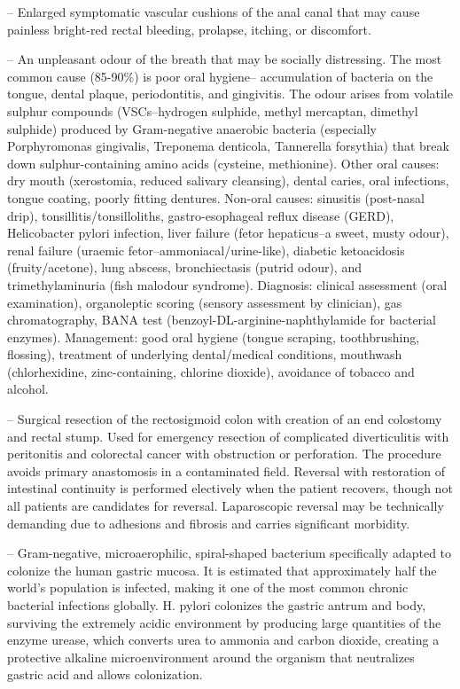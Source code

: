 -- Enlarged symptomatic vascular cushions of the anal canal that may cause painless bright-red rectal bleeding, prolapse, itching, or discomfort.

-- An unpleasant odour of the breath that may be socially distressing. The most common cause (85-90\%) is poor oral hygiene-- accumulation of bacteria on the tongue, dental plaque, periodontitis, and gingivitis. The odour arises from volatile sulphur compounds (VSCs--hydrogen sulphide, methyl mercaptan, dimethyl sulphide) produced by Gram-negative anaerobic bacteria (especially Porphyromonas gingivalis, Treponema denticola, Tannerella forsythia) that break down sulphur-containing amino acids (cysteine, methionine). Other oral causes: dry mouth (xerostomia, reduced salivary cleansing), dental caries, oral infections, tongue coating, poorly fitting dentures. Non-oral causes: sinusitis (post-nasal drip), tonsillitis/tonsilloliths, gastro-esophageal reflux disease (GERD), Helicobacter pylori infection, liver failure (fetor hepaticus--a sweet, musty odour), renal failure (uraemic fetor--ammoniacal/urine-like), diabetic ketoacidosis (fruity/acetone), lung abscess, bronchiectasis (putrid odour), and trimethylaminuria (fish malodour syndrome). Diagnosis: clinical assessment (oral examination), organoleptic scoring (sensory assessment by clinician), gas chromatography, BANA test (benzoyl-DL-arginine-naphthylamide for bacterial enzymes). Management: good oral hygiene (tongue scraping, toothbrushing, flossing), treatment of underlying dental/medical conditions, mouthwash (chlorhexidine, zinc-containing, chlorine dioxide), avoidance of tobacco and alcohol.

-- Surgical resection of the rectosigmoid colon with creation of an end colostomy and rectal stump. Used for emergency resection of complicated diverticulitis with peritonitis and colorectal cancer with obstruction or perforation. The procedure avoids primary anastomosis in a contaminated field. Reversal with restoration of intestinal continuity is performed electively when the patient recovers, though not all patients are candidates for reversal. Laparoscopic reversal may be technically demanding due to adhesions and fibrosis and carries significant morbidity.

-- Gram-negative, microaerophilic, spiral-shaped bacterium specifically adapted to colonize the human gastric mucosa. It is estimated that approximately half the world's population is infected, making it one of the most common chronic bacterial infections globally. H. pylori colonizes the gastric antrum and body, surviving the extremely acidic environment by producing large quantities of the enzyme urease, which converts urea to ammonia and carbon dioxide, creating a protective alkaline microenvironment around the organism that neutralizes gastric acid and allows colonization.

